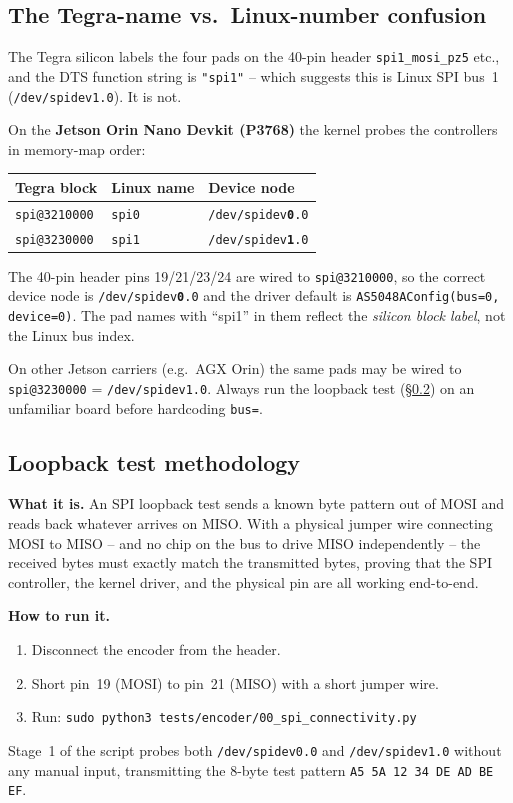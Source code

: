 \documentclass[11pt,a4paper]{article}
\begin{document}
\subsection{The Tegra-name vs.~Linux-number confusion}
The Tegra silicon labels the four pads on the 40-pin header
\texttt{spi1\_mosi\_pz5} etc., and the DTS function string is
\texttt{"spi1"} -- which suggests this is Linux SPI bus~1
(\texttt{/dev/spidev1.0}).  It is not.

On the \textbf{Jetson Orin Nano Devkit (P3768)} the kernel probes the
controllers in memory-map order:
\begin{center}\small
\begin{tabular}{lll}
\toprule
Tegra block & Linux name & Device node \\
\midrule
\texttt{spi@3210000} & \texttt{spi0} & \texttt{/dev/spidev\textbf{0}.0} \\
\texttt{spi@3230000} & \texttt{spi1} & \texttt{/dev/spidev\textbf{1}.0} \\
\bottomrule
\end{tabular}
\end{center}

The 40-pin header pins 19/21/23/24 are wired to \texttt{spi@3210000},
so the correct device node is \texttt{/dev/spidev\textbf{0}.0} and the
driver default is \texttt{AS5048AConfig(bus=0, device=0)}.  The pad
names with ``spi1'' in them reflect the \emph{silicon block label}, not
the Linux bus index.

On other Jetson carriers (e.g.\ AGX Orin) the same pads may be wired to
\texttt{spi@3230000} = \texttt{/dev/spidev1.0}.  Always run the
loopback test (\S\ref{sec:loopback}) on an unfamiliar board before
hardcoding \texttt{bus=}.

\subsection{Loopback test methodology}
\label{sec:loopback}

\textbf{What it is.}
An SPI loopback test sends a known byte pattern out of MOSI and reads
back whatever arrives on MISO.  With a physical jumper wire connecting
MOSI to MISO -- and no chip on the bus to drive MISO independently --
the received bytes must exactly match the transmitted bytes, proving
that the SPI controller, the kernel driver, and the physical pin are
all working end-to-end.

\textbf{How to run it.}
\begin{enumerate}
  \item Disconnect the encoder from the header.
  \item Short pin~19 (MOSI) to pin~21 (MISO) with a short jumper wire.
  \item Run: \texttt{sudo python3 tests/encoder/00\_spi\_connectivity.py}
\end{enumerate}
Stage~1 of the script probes both \texttt{/dev/spidev0.0} and
\texttt{/dev/spidev1.0} without any manual input, transmitting the
8-byte test pattern \texttt{A5 5A 12 34 DE AD BE EF}.
\end{document}
